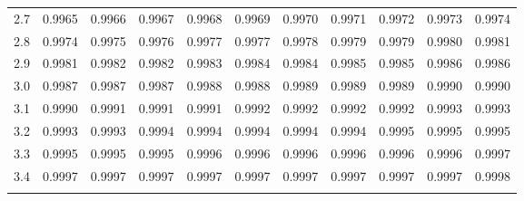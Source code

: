 \begin{tabular}{l|llllllllll}
2.7 & 0.9965 & 0.9966 & 0.9967 & 0.9968 & 0.9969 & 0.9970 & 0.9971 & 0.9972 & 0.9973 & 0.9974 \\\arrayrulecolor{light-gray}\hline\arrayrulecolor{black} 
2.8 & 0.9974 & 0.9975 & 0.9976 & 0.9977 & 0.9977 & 0.9978 & 0.9979 & 0.9979 & 0.9980 & 0.9981 \\\arrayrulecolor{light-gray}\hline\arrayrulecolor{black} 
2.9 & 0.9981 & 0.9982 & 0.9982 & 0.9983 & 0.9984 & 0.9984 & 0.9985 & 0.9985 & 0.9986 & 0.9986 \\\arrayrulecolor{light-gray}\hline\arrayrulecolor{black} 
3.0 & 0.9987 & 0.9987 & 0.9987 & 0.9988 & 0.9988 & 0.9989 & 0.9989 & 0.9989 & 0.9990 & 0.9990 \\\arrayrulecolor{light-gray}\hline\arrayrulecolor{black} 
3.1 & 0.9990 & 0.9991 & 0.9991 & 0.9991 & 0.9992 & 0.9992 & 0.9992 & 0.9992 & 0.9993 & 0.9993 \\\arrayrulecolor{light-gray}\hline\arrayrulecolor{black} 
3.2 & 0.9993 & 0.9993 & 0.9994 & 0.9994 & 0.9994 & 0.9994 & 0.9994 & 0.9995 & 0.9995 & 0.9995 \\\arrayrulecolor{light-gray}\hline\arrayrulecolor{black} 
3.3 & 0.9995 & 0.9995 & 0.9995 & 0.9996 & 0.9996 & 0.9996 & 0.9996 & 0.9996 & 0.9996 & 0.9997 \\\arrayrulecolor{light-gray}\hline\arrayrulecolor{black} 
3.4 & 0.9997 & 0.9997 & 0.9997 & 0.9997 & 0.9997 & 0.9997 & 0.9997 & 0.9997 & 0.9997 & 0.9998 \\\arrayrulecolor{light-gray}\hline\arrayrulecolor{black} 
\end{tabular}

\clearpage

